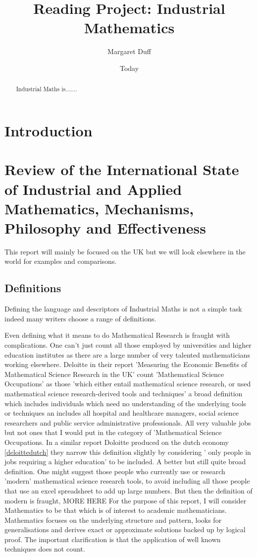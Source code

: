 \documentclass[11pt]{article} %
\begin{document}
	
	\title{Reading Project: Industrial Mathematics }
	\author{Margaret Duff }
	\date{Today}
	\maketitle
	
	\begin{abstract}
		Industrial Maths is.......
	\end{abstract}
	\tableofcontents 
	
	\section{Introduction}
	
	\section{Review of the International State of Industrial and Applied Mathematics, Mechanisms, Philosophy and Effectiveness}
	
	This report will mainly be  focused on the UK but we will look elsewhere in the world for examples and comparisons. 
	\subsection{Definitions} 
	
	Defining the language and descriptors of  Industrial Maths is not a simple task indeed many writers choose a range of definitions. 
	
	Even defining what it means to do Mathematical Research is fraught with complications. One can't just count all those employed by universities and higher education institutes as there are a large number of very talented mathematicians working elsewhere. 	Deloitte in their report 'Measuring the Economic Benefits of Mathematical Science Research in the UK' \cite{deloitteuk} count 'Mathematical Science Occupations' as those 'which either entail mathematical science research, or used mathematical science research-derived tools and techniques' a broad definition which includes individuals which need no understanding of the underlying tools or techniques an includes all hospital and healthcare managers, social science researchers and public service administrative professionals. All very valuable jobs but not ones that I would put in the category of 'Mathematical Science Occupations. 
	In a similar report Doloitte produced on the dutch economy \ref{deloittedutch} they narrow this definition slightly by considering ' only people in jobs requiring a higher education' to be included.  A better but still quite broad definition.
	One might suggest those people who currently use or research 'modern' mathematical science research tools, to avoid including all those people that use an excel spreadsheet to add up large numbers. But then the definition of modern is fraught, MORE HERE
	For the purpose of this report, I  will consider Mathematics to be that which is of interest to academic mathematicians. Mathematics focuses on the underlying structure and pattern, looks for generalisations and derives exact or approximate solutions backed up by logical proof. The important clarification is that the application of well known techniques does not count. 
	
\end{document}
